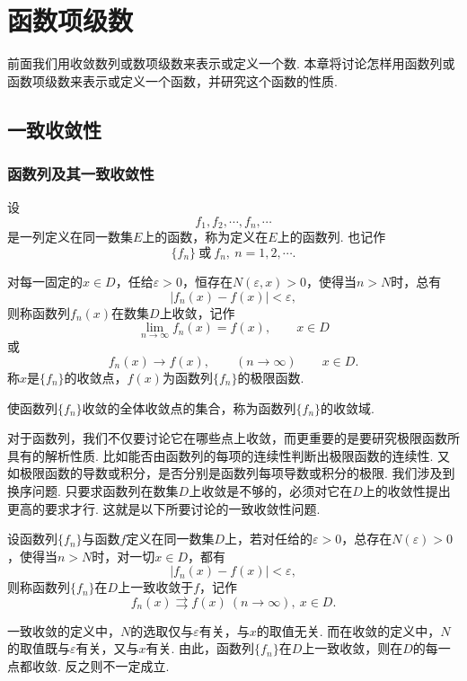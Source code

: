 \chapter{函数项级数}
前面我们用收敛数列或数项级数来表示或定义一个数. 本章将讨论怎样用函数列或函数项级数来表示或定义一个函数，并研究这个函数的性质.
\section{一致收敛性}
\subsection{函数列及其一致收敛性}
\begin{definition}[函数列]
	设
	$$f_1,f_2,\cdots,f_n,\cdots$$
	是一列定义在同一数集$E$上的函数，称为定义在$E$上的{\heiti 函数列}. 也记作
	$$\{f_n\}\ \text{或}\ f_n,\ n=1,2,\cdots.$$
\end{definition}
\begin{definition}[函数列极限]
	对每一固定的$x\in D$，任给$\varepsilon>0$，恒存在$N(\varepsilon,x)>0$，使得当$n>N$时，总有
	$$|f_n(x)-f(x)|<\varepsilon,$$
	则称函数列$f_n(x)${\heiti 在数集$D$上收敛}，记作
	$$\lim\limits_{n\to\infty}f_n(x)=f(x),\qquad x\in D$$
	或
	$$f_n(x)\to f(x),\qquad (n\to\infty)\qquad x\in D.$$
	称$x$是$\{f_n\}$的{\heiti 收敛点}，$f(x)$为函数列$\{f_n\}$的{\heiti 极限函数}. 
	
	使函数列$\{f_n\}$收敛的全体收敛点的集合，称为函数列$\{f_n\}$的{\heiti 收敛域}.
\end{definition}
对于函数列，我们不仅要讨论它在哪些点上收敛，而更重要的是要研究极限函数所具有的解析性质. 比如能否由函数列的每项的连续性判断出极限函数的连续性. 又如极限函数的导数或积分，是否分别是函数列每项导数或积分的极限. 我们涉及到换序问题. 只要求函数列在数集$D$上收敛是不够的，必须对它在$D$上的收敛性提出更高的要求才行. 这就是以下所要讨论的一致收敛性问题.
\begin{definition}[一致收敛]
	设函数列$\{f_n\}$与函数$f$定义在同一数集$D$上，若对任给的$\varepsilon>0$，总存在$N(\varepsilon)>0$，使得当$n>N$时，对一切$x\in D$，都有
	$$|f_n(x)-f(x)|<\varepsilon,$$
	则称函数列$\{f_n\}$在$D$上{\heiti 一致收敛}于$f$，记作
	$$f_n(x)\rightrightarrows f(x)\ (n\to\infty),\ x\in D.$$
\end{definition}
\begin{remark}
	一致收敛的定义中，$N$的选取仅与$\varepsilon$有关，与$x$的取值无关. 而在收敛的定义中，$N$的取值既与$\varepsilon$有关，又与$x$有关. 由此，函数列$\{f_n\}$在$D$上一致收敛，则在$D$的每一点都收敛. 反之则不一定成立.
\end{remark}

